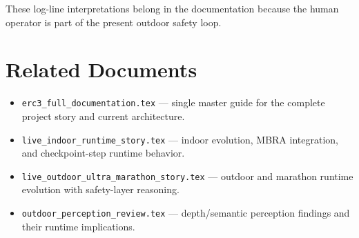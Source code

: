 \documentclass[11pt]{article}
\begin{document}
These log-line interpretations belong in the documentation because the human operator is part of the present outdoor safety loop.


\section{Related Documents}
\begin{itemize}
  \item \texttt{erc3\_full\_documentation.tex} --- single master guide for the complete project story and current architecture.
  \item \texttt{live\_indoor\_runtime\_story.tex} --- indoor evolution, MBRA integration, and checkpoint-step runtime behavior.
  \item \texttt{live\_outdoor\_ultra\_marathon\_story.tex} --- outdoor and marathon runtime evolution with safety-layer reasoning.
  \item \texttt{outdoor\_perception\_review.tex} --- depth/semantic perception findings and their runtime implications.
\end{itemize}
\end{document}
